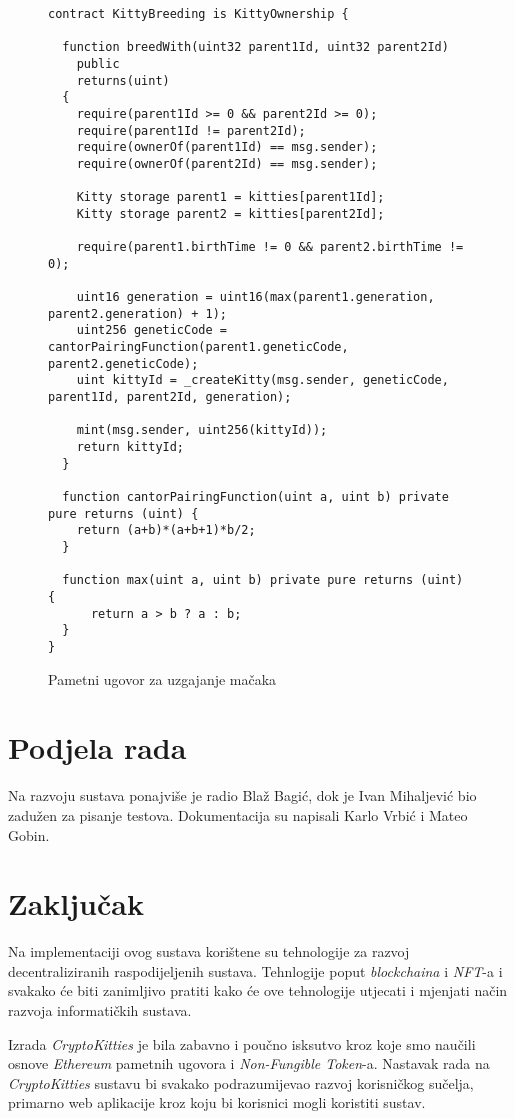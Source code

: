 \documentclass[times, utf8, tehnicka_dokumentacija]{fer}
\begin{document}
\begin{figure}
\begin{lstlisting}
contract KittyBreeding is KittyOwnership {

  function breedWith(uint32 parent1Id, uint32 parent2Id)
    public
    returns(uint)
  {
    require(parent1Id >= 0 && parent2Id >= 0);
    require(parent1Id != parent2Id);
    require(ownerOf(parent1Id) == msg.sender);
    require(ownerOf(parent2Id) == msg.sender);

    Kitty storage parent1 = kitties[parent1Id];
    Kitty storage parent2 = kitties[parent2Id];

    require(parent1.birthTime != 0 && parent2.birthTime != 0);

    uint16 generation = uint16(max(parent1.generation, parent2.generation) + 1);
    uint256 geneticCode = cantorPairingFunction(parent1.geneticCode, parent2.geneticCode);
    uint kittyId = _createKitty(msg.sender, geneticCode, parent1Id, parent2Id, generation);

    mint(msg.sender, uint256(kittyId));
    return kittyId;
  }

  function cantorPairingFunction(uint a, uint b) private pure returns (uint) {
    return (a+b)*(a+b+1)*b/2;
  }

  function max(uint a, uint b) private pure returns (uint) {
      return a > b ? a : b;
  }
}
\end{lstlisting}
\caption{Pametni ugovor za uzgajanje mačaka}
\label{lst:kittymarket}
\end{figure}

\chapter{Podjela rada}
Na razvoju sustava ponajviše je radio Blaž Bagić, dok je Ivan Mihaljević bio zadužen za pisanje testova. Dokumentacija su napisali Karlo Vrbić i Mateo Gobin.

\chapter{Zaključak}
Na implementaciji ovog sustava korištene su tehnologije za razvoj decentraliziranih raspodijeljenih sustava. Tehnlogije poput {\it blockchaina} i {\it NFT}-a i svakako će biti zanimljivo pratiti kako će ove tehnologije utjecati i mjenjati način razvoja informatičkih sustava.

Izrada {\it CryptoKitties} je bila zabavno i poučno isksutvo kroz koje smo naučili osnove {\it Ethereum} pametnih ugovora i {\it Non-Fungible Token}-a. Nastavak rada na {\it CryptoKitties} sustavu bi svakako podrazumijevao razvoj korisničkog sučelja, primarno web aplikacije kroz koju bi korisnici mogli koristiti sustav.



\end{document}
